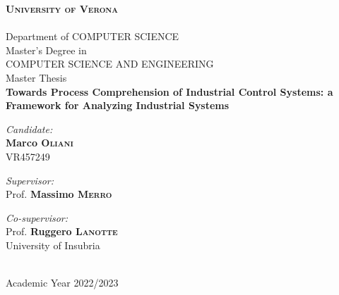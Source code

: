 
\newcommand{\thesistitle}{Towards Process Comprehension of Industrial Control Systems: a Framework for Analyzing Industrial Systems}
\newcommand{\supervisor}{Prof. \textbf{Massimo \textsc{Merro}}}
\newcommand{\firstcosupervisor}{Prof. \textbf{Ruggero \textsc{Lanotte}}\\University of Insubria}
\newcommand{\secondcosupervisor}{\textbf{Marco \textsc{Lucchese}}}
\newcommand{\opponent}{Prof. \textbf{Mariano \textsc{Ceccato}}}
\newcommand{\candidate}{\textbf{Marco \textsc{Oliani}}\\VR457249}
\newcommand{\academicyear}{\normalsize Academic Year 2022/2023}

\begin{titlepage}
	\begin{center}
		\thispagestyle{empty}
		
		
		\textsc{\Large\bfseries University of Verona}\\
		\hrulefill \\[0.1cm]
		\large Department of \textsc{COMPUTER SCIENCE}\\[1.0cm]
		
		\normalsize Master's Degree in \\
		\normalsize\textsc{COMPUTER SCIENCE AND ENGINEERING}\\[1.5cm]
		
		\large Master Thesis \\[1.0cm]
		
		{ \Large\bfseries\thesistitle} \\[3.0cm]
		
		\begin{minipage}[t]{0.45\textwidth}
			\begin{flushleft} \normalsize
				\emph{Candidate:} \\
				\candidate
			\end{flushleft}
		\end{minipage}
		\begin{minipage}[t]{0.45\textwidth}\raggedleft
			\begin{flushright} \normalsize
				\emph{Supervisor:}\\
				\supervisor 
			\end{flushright}
			\begin{flushright} \normalsize
				\emph{Co-supervisor:}\\
				\firstcosupervisor \\
			\end{flushright}
		\end{minipage}
		
		\vfill
		
		\hrulefill \\[0.1cm]
		\academicyear
		
	\end{center}
\end{titlepage}

\thispagestyle{empty}